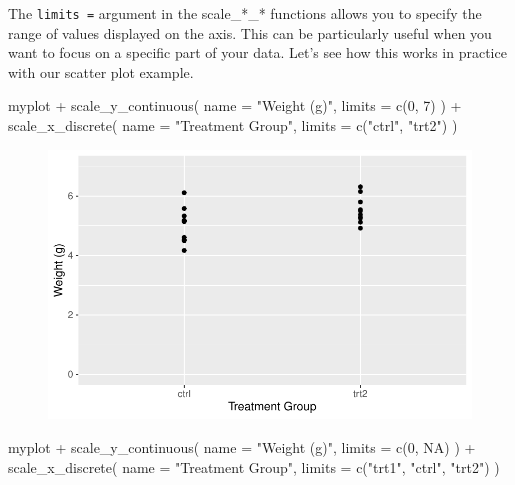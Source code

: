 \documentclass[
  letterpaper,
  DIV=11,
  numbers=noendperiod]{scrartcl}
\newenvironment{Shaded}{\begin{snugshade}}{\end{snugshade}}
\newcommand{\AttributeTok}[1]{\textcolor[rgb]{0.40,0.45,0.13}{#1}}
\newcommand{\ConstantTok}[1]{\textcolor[rgb]{0.56,0.35,0.01}{#1}}
\newcommand{\DecValTok}[1]{\textcolor[rgb]{0.68,0.00,0.00}{#1}}
\newcommand{\FunctionTok}[1]{\textcolor[rgb]{0.28,0.35,0.67}{#1}}
\newcommand{\NormalTok}[1]{\textcolor[rgb]{0.00,0.23,0.31}{#1}}
\newcommand{\SpecialCharTok}[1]{\textcolor[rgb]{0.37,0.37,0.37}{#1}}
\newcommand{\StringTok}[1]{\textcolor[rgb]{0.13,0.47,0.30}{#1}}
\begin{document}
The \texttt{limits\ =} argument in the scale\_*\_* functions allows you
to specify the range of values displayed on the axis. This can be
particularly useful when you want to focus on a specific part of your
data. Let's see how this works in practice with our scatter plot
example.

\begin{Shaded}
\begin{Highlighting}[]
\NormalTok{myplot }\SpecialCharTok{+}
  \FunctionTok{scale\_y\_continuous}\NormalTok{(}
    \AttributeTok{name =} \StringTok{"Weight (g)"}\NormalTok{,}
    \AttributeTok{limits =} \FunctionTok{c}\NormalTok{(}\DecValTok{0}\NormalTok{, }\DecValTok{7}\NormalTok{)}
\NormalTok{  ) }\SpecialCharTok{+}
  \FunctionTok{scale\_x\_discrete}\NormalTok{(}
    \AttributeTok{name =} \StringTok{"Treatment Group"}\NormalTok{,}
    \AttributeTok{limits =} \FunctionTok{c}\NormalTok{(}\StringTok{"ctrl"}\NormalTok{, }\StringTok{"trt2"}\NormalTok{)}
\NormalTok{  )}
\end{Highlighting}
\end{Shaded}

\begin{figure}[H]

{\centering \includegraphics{ggplot2intro_files/figure-pdf/unnamed-chunk-8-1.pdf}

}

\end{figure}

\begin{Shaded}
\begin{Highlighting}[]
\NormalTok{myplot }\SpecialCharTok{+}
  \FunctionTok{scale\_y\_continuous}\NormalTok{(}
    \AttributeTok{name =} \StringTok{"Weight (g)"}\NormalTok{,}
    \AttributeTok{limits =} \FunctionTok{c}\NormalTok{(}\DecValTok{0}\NormalTok{, }\ConstantTok{NA}\NormalTok{)}
\NormalTok{  ) }\SpecialCharTok{+}
  \FunctionTok{scale\_x\_discrete}\NormalTok{(}
    \AttributeTok{name =} \StringTok{"Treatment Group"}\NormalTok{,}
    \AttributeTok{limits =} \FunctionTok{c}\NormalTok{(}\StringTok{"trt1"}\NormalTok{, }\StringTok{"ctrl"}\NormalTok{, }\StringTok{"trt2"}\NormalTok{)}
\NormalTok{  )}
\end{Highlighting}
\end{Shaded}
\end{document}
